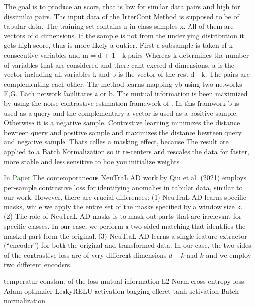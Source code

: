 The goal is to produce an score, that is low for similar data pairs and high for dissimilar pairs.
The input data of the InterCont Method is supposed to be of tabular data.
The training set contains n in-class samples x. All of them are vectors of d dimensions.
If the sample is not from the underlying distribution it gets high score, thus is more likely a outlier. 
First a subsample is taken of k consecutive variables and m = d + 1 - k pairs %
Whereas k determines the number of variables that are considered and there cant exceed d dimensions.
a is the vector including all variables k and b is the vector of the rest d - k. 
The pairs are complementing each other. 
The method learns mapping yb using two networks F,G. Each network facilitates a or b.
The mutual information is been maximized by using the noise contrastive estimation framework of \citep{oord2018representation}.
In this framwork b is used as a query and the complementary a vector is used as a positive sample. Otherwise it is a negative sample.
Contrestive learning minimizes the distance bewteen query and positive sample and maximizes the distance bewteen query and negative sample.
Thats calles a masking effect, because 
The result are applied to a Batch Normalization so it re-centers and rescales the data for faster, more stable and less sensitive to hoe you initialize weights



\textcolor{green}{In Paper}
The contemporaneous NeuTraL AD work by Qiu et al. (2021) employs per-sample contrastive loss
for identifying anomalies in tabular data, similar to our work. However, there are crucial differences:
(1) NeuTraL AD learns specific masks, while we apply the entire set of the masks specified by a
window size k. (2) The role of NeuTraL AD masks is to mask-out parts that are irrelevant for specific
classes. In our case, we perform a two sided matching that identifies the masked part form the original.
(3) NeuTraL AD learns a single feature extractor (“encoder”) for both the original and transformed
data. In our case, the two sides of the contrastive loss are of very different dimensions $d - k$ and $k$
and we employ two different encoders. \cite[p.3]{shenkar2022anomaly}








temperatur constant of the loss 
mutual information
L2 Norm 
cross entropy loss Adam optimzier 
LeakyRELU activation 
bagging efferct
tanh activation 
Batch normalization 